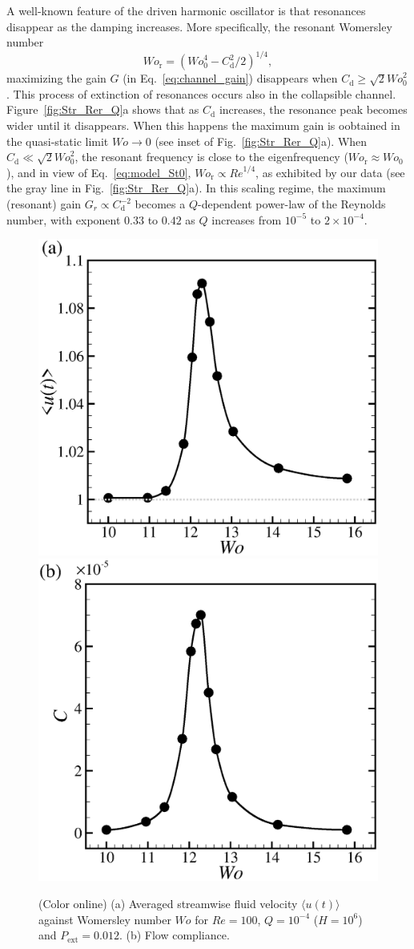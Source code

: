 \documentclass[aps,prl,reprint,superscriptaddress,floatfix]{revtex4-1}
\newcommand{\Rey}{\mathit{Re}}
\newcommand{\Wo}{\mathit{Wo}}
\begin{document}
A well-known feature of the driven harmonic oscillator is that resonances disappear as the damping increases. More specifically, the resonant Womersley number
\begin{equation}
\Wo_\text{r}=(\Wo^4_0-C_\mathrm{d}^2/2)^{1/4},
\label{eq:St_resonance}
\end{equation}
maximizing the gain $G$ (in Eq.~\ref{eq:channel_gain}) disappears when $C_\text{d} \geqslant \sqrt{2}\Wo^2_0$. This process of extinction of resonances occurs also in the collapsible channel. Figure~\ref{fig:Str_Rer_Q}a shows that as $C_\text{d}$ increases, the resonance peak becomes wider until it disappears. When this happens the maximum gain is oobtained in the quasi-static limit $\Wo\rightarrow 0$ (see inset of Fig.~\ref{fig:Str_Rer_Q}a). When $C_\text{d} \ll \sqrt{2}\Wo^2_0$, the resonant frequency is close to the eigenfrequency ($\Wo_\text{r}\approx\Wo_0$), and in view of Eq.~\ref{eq:model_St0}, $\Wo_\text{r}\propto \Rey^{1/4}$, as exhibited by our data (see the gray line in Fig.~\ref{fig:Str_Rer_Q}a). In this scaling regime, the maximum (resonant) gain $G_r \propto C_\text{d}^{-2}$  becomes a $Q$-dependent power-law of the Reynolds number, with exponent $0.33$ to $0.42$ as $Q$ increases from $10^{-5}$ to $2\times10^{-4}$. 

\begin{figure}
\centering
\includegraphics[width=0.49\linewidth, trim={0.2cm 0.4cm 0.4cm 0.5cm}, clip]{./epsFig/fig6a.eps}
\includegraphics[width=0.49\linewidth, trim={0.2cm 0.4cm 0.4cm 0.5cm}, clip]{./epsFig/fig6b.eps}
\caption{(Color online) (a) Averaged streamwise fluid velocity $\langle u(t) \rangle$ against Womersley number $\Wo$ for $\Rey=100$, $Q=10^{-4}$ ($H=10^6$) and  $P_\mathrm{ext}=0.012$. (b) Flow compliance.}	\label{fig:flowrate_compliance}
\end{figure}
\end{document}
